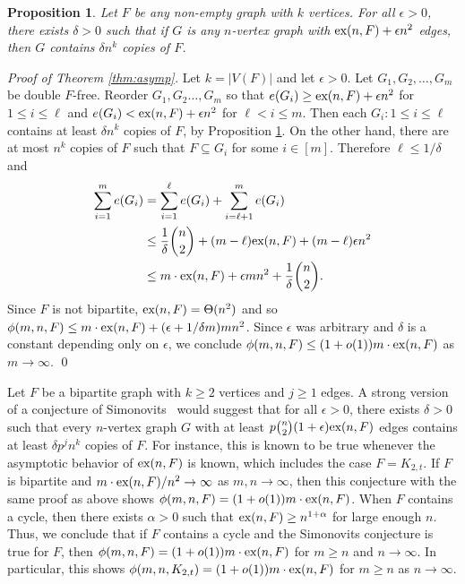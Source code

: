 \documentclass[12pt]{article}
\newtheorem{proposition}[theorem]{Proposition}
\newcommand*{\ex}{\textnormal{ex}}
\begin{document}
\begin{proposition}\label{thm:sat}
Let $F$ be any non-empty graph with $k$ vertices.
For all $\epsilon > 0$, there exists $\delta > 0$ such that if $G$ is any $n$-vertex graph with $\ex(n,F) + \epsilon n^2$ edges, then 
$G$ contains $\delta n^k$ copies of $F$. 
\end{proposition}

\textit{Proof of Theorem \ref{thm:asymp}.}
  Let $k = |V(F)|$ and let $\epsilon > 0$. Let $G_1,G_2,\dots,G_m$ be double $F$-free. 
  Reorder $G_1,G_2 \ldots, G_m$ so that 
  $e(G_i) \geq \ex(n,F) + \epsilon n^2$ for $1 \leq i \leq \ell$ and $e(G_i) <\ex(n,F) + \epsilon n^2$ for $\ell < i \leq m$. Then each $G_i : 1 \leq i \leq \ell$ contains at least $\delta n^k$ copies of $F$, by Proposition \ref{thm:sat}. On the other hand, there are at most $n^k$ copies of $F$ 
  such that $F \subseteq G_i$ for some $i \in [m]$. 
  Therefore $\ell \leq 1/\delta$ and
  \begin{align*}
    \sum_{i = 1}^m e(G_i) 
    &= \sum_{i = 1}^{\ell} e(G_i) + \sum_{i =\ell + 1}^m e(G_i) \\
    &\leq \frac{1}{\delta}\binom{n}{2} + (m - \ell)\ex(n,F) + (m - \ell) \epsilon n^2 \\
    &\leq m \cdot \ex(n,F) + \epsilon m n^2 + \frac{1}{\delta}\binom{n}{2}.
  \end{align*}
Since $F$ is not bipartite, $\ex(n,F) = \Theta(n^2)$ and so $\phi(m,n,F) \leq m \cdot \ex(n,F) + (\epsilon + 1/\delta m)mn^2$. Since $\epsilon$ was arbitrary and $\delta$ is a constant depending only on $\epsilon$, 
we conclude $\phi(m,n,F) \leq (1 + o(1))m \cdot \ex(n,F)$ as $m \rightarrow \infty$. \qed

Let $F$ be a bipartite graph with $k \geq 2$ vertices and $j \geq 1$ edges. A strong version of a conjecture of Simonovits~\cite{Sidorenko1993,Simonovits1984} would suggest that for all $\epsilon > 0$, there exists $\delta > 0$ such that every $n$-vertex graph $G$ with at least $p\binom{n}{2}(1 + \epsilon)\ex(n,F)$ edges contains at least $\delta p^j n^{k}$ copies of $F$. For instance, this is known to be true whenever the asymptotic behavior of $\ex(n,F)$ is known, which includes the case $F = K_{2,t}$. If $F$ is bipartite and $m \cdot \ex(n,F)/n^2 \rightarrow \infty$ as $m,n \rightarrow \infty$, then this conjecture with the same proof as above shows $\phi(m,n,F) = (1 + o(1))m \cdot \ex(n,F)$. When $F$ contains a cycle, then there exists $\alpha > 0$ such that $\ex(n,F) \geq n^{1 + \alpha}$ for large enough $n$. Thus, we conclude that if $F$ contains a cycle and the Simonovits conjecture is true for $F$, then $\phi(m,n,F) = (1 + o(1))m \cdot \ex(n,F)$ for $m \geq n$ and $n \rightarrow \infty$. In particular, this shows $\phi(m,n,K_{2,t}) = (1 + o(1))m \cdot \ex(n,F)$ for $m \geq n$ as $n \rightarrow \infty$.
\end{document}
